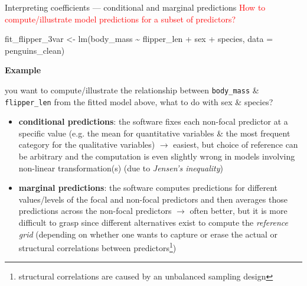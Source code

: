 \documentclass[
  10pt,
  ignorenonframetext,
  aspectratio=169,
  t]{beamer}
\newenvironment{Shaded}{\begin{snugshade}}{\end{snugshade}}
\newcommand{\AttributeTok}[1]{\textcolor[rgb]{0.40,0.45,0.13}{#1}}
\newcommand{\FunctionTok}[1]{\textcolor[rgb]{0.28,0.35,0.67}{#1}}
\newcommand{\NormalTok}[1]{\textcolor[rgb]{0.00,0.23,0.31}{#1}}
\newcommand{\OtherTok}[1]{\textcolor[rgb]{0.00,0.23,0.31}{#1}}
\newcommand{\SpecialCharTok}[1]{\textcolor[rgb]{0.37,0.37,0.37}{#1}}
\newcommand{\blueit}[1]{\textcolor{bluebeamer}{\emph{#1}}}
\newcommand{\bluebold}[1]{\textcolor{bluebeamer}{\textbf{#1}}}
\let\oldtexttt\texttt
\renewcommand{\texttt}[1]{\colorbox{gray!20}{\oldtexttt{#1}}}
\begin{document}
\begin{frame}[fragile]{Interpreting coefficients --- conditional and
marginal predictions}
\protect{}\label{interpreting-coefficients-conditional-and-marginal-predictions}
\textcolor{red}{How to compute/illustrate model predictions for a subset of predictors?}

\footnotesize

\begin{Shaded}
\begin{Highlighting}[]
\NormalTok{fit\_flipper\_3var }\OtherTok{\textless{}{-}} \FunctionTok{lm}\NormalTok{(body\_mass }\SpecialCharTok{\textasciitilde{}}\NormalTok{ flipper\_len }\SpecialCharTok{+}\NormalTok{ sex }\SpecialCharTok{+}\NormalTok{ species, }\AttributeTok{data =}\NormalTok{ penguins\_clean)}
\end{Highlighting}
\end{Shaded}

\normalsize

\textbf{Example}

you want to compute/illustrate the relationship between
\texttt{body\_mass} \& \texttt{flipper\_len} from the fitted model
above, what to do with sex \& species?

\begin{small}
\begin{itemize}
\item<2-> \bluebold{conditional predictions}: the software fixes each non-focal predictor at a specific value (e.g. the mean for quantitative variables \& the most frequent category for the qualitative variables) $\rightarrow$ easiest, but choice of reference can be arbitrary and the computation is even slightly wrong in models involving non-linear transformation(s) (due to \blueit{Jensen's inequality})
\item<3-> \bluebold{marginal predictions}: the software computes predictions for different values/levels of the focal and non-focal predictors and then averages those predictions across the non-focal predictors $\rightarrow$ often better, but it is more difficult to grasp since different alternatives exist to compute the \blueit{reference grid} (depending on whether one wants to capture or erase the actual or structural correlations between predictors\footnote{structural correlations are caused by an unbalanced sampling design})
\end{itemize}
\end{small}
\end{frame}
\end{document}
